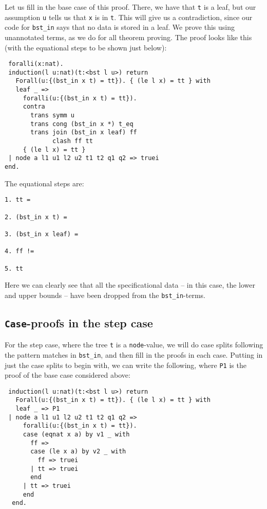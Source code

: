 \documentclass{book}[12pt]
\begin{document}
Let us fill in the base case of this proof.  There, we have that
\texttt{t} is a leaf, but our assumption \texttt{u} tells us that
\texttt{x} is in \texttt{t}.  This will give us a contradiction, since
our code for \texttt{bst\_in} says that no data is stored in a leaf.
We prove this using unannotated terms, as we do for all theorem
proving.  The proof looks like this (with the equational steps to be
shown just below):

\begin{verbatim}
 foralli(x:nat).
 induction(l u:nat)(t:<bst l u>) return
   Forall(u:{(bst_in x t) = tt}). { (le l x) = tt } with
   leaf _ => 
     foralli(u:{(bst_in x t) = tt}).
     contra
       trans symm u
       trans cong (bst_in x *) t_eq
       trans join (bst_in x leaf) ff
             clash ff tt
     { (le l x) = tt }
 | node a l1 u1 l2 u2 t1 t2 q1 q2 => truei
end.
\end{verbatim}

\noindent The equational steps are:

\begin{verbatim}
1. tt =

2. (bst_in x t) =

3. (bst_in x leaf) =

4. ff !=

5. tt
\end{verbatim}

\noindent Here we can clearly see that all the specificational data --
in this case, the lower and upper bounds -- have been dropped from the
\texttt{bst\_in}-terms.

\subsection{\texttt{Case}-proofs in the step case}

For the step case, where the tree \texttt{t} is a \texttt{node}-value,
we will do case splits following the pattern matches in
\texttt{bst\_in}, and then fill in the proofs in each case.  Putting
in just the case splits to begin with, we can write the following,
where \texttt{P1} is the proof of the base case considered above:

\begin{verbatim}
 induction(l u:nat)(t:<bst l u>) return
   Forall(u:{(bst_in x t) = tt}). { (le l x) = tt } with
   leaf _ => P1
 | node a l1 u1 l2 u2 t1 t2 q1 q2 => 
     foralli(u:{(bst_in x t) = tt}).
     case (eqnat x a) by v1 _ with
       ff =>
       case (le x a) by v2 _ with
         ff => truei
       | tt => truei
       end
     | tt => truei
     end
  end.
\end{verbatim}
\end{document}
